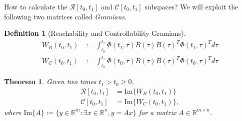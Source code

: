 \documentclass[11pt,a4paper,titlepage]{article}
\newtheorem{definition}{Definition}
\newtheorem{theorem}{Theorem}
\begin{document}
How to calculate the $\mathcal{R}[t_0,t_1]$ and $\mathcal{C}[t_0,t_1]$ subspaces? We will exploit the following two matrices called \emph{Gramians}.

\begin{definition}[Reachability and Controllability Gramians]
	\begin{align}
		W_R(t_0,t_1) &:= \int_{t_0}^{t_1} \Phi(t_1,\tau)B(\tau)B(\tau)^T\Phi(t_1,\tau)^Td\tau \\
		W_C(t_0,t_1) &:= \int_{t_0}^{t_1} \Phi(t_0,\tau)B(\tau)B(\tau)^T\Phi(t_0,\tau)^Td\tau 
	\end{align}
\end{definition}

\begin{theorem}
Given two times $t_1 > t_0 \geq 0$,
	\begin{align}
		\mathcal{R}[t_0,t_1] &= \text{Im}\{W_R(t_0,t_1)\} \label{RI} \\
		\mathcal{C}[t_0,t_1] &= \text{Im}\{W_C(t_0,t_1)\} \label{CI},
	\end{align}
	where $\text{Im}\{A\}:= \Big\{y\in\mathbb{R}^m: \exists x\in\mathbb{R}^n, y = Ax\Big\}$ for a matrix $A\in\mathbb{R}^{m\times n}$.
\end{theorem}
\end{document}
